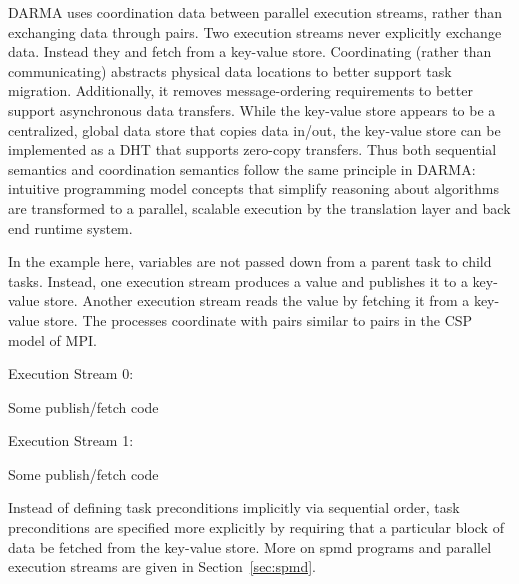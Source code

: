 \gls{DARMA} uses coordination data between parallel \glspl{execution stream},
rather than exchanging data through  pairs. 
Two \glspl{execution stream} never explicitly exchange data. Instead they
 and fetch from a \gls{key-value store}.
Coordinating (rather than communicating) abstracts physical data locations to
better support \gls{task} migration.
Additionally, it removes message-ordering requirements to better support
\gls{asynchronous} data transfers.
While the \gls{key-value store} appears to be a centralized, global data store that copies data in/out,
the \gls{key-value store} can be implemented as a \gls{DHT} that supports
\gls{zero-copy} transfers.
Thus both \gls{sequential semantics} and \gls{coordination semantics} follow
the same principle in \gls{DARMA}: intuitive \gls{programming model}
concepts that simplify reasoning about algorithms are 
transformed to a parallel, scalable execution by the \gls{translation layer}
and \gls{back end} \gls{runtime system}.

In the example here, variables are not passed down from a \gls{parent task} to
\glspl{child task}.
Instead, one \gls{execution stream} produces a value and publishes it to a
\gls{key-value store}.
Another \gls{execution stream} reads the value by fetching it from a
\gls{key-value store}.
The processes coordinate with  pairs similar to
 pairs in
the \gls{CSP} model of MPI.

\begin{minipage}{0.45\textwidth}
Execution Stream 0:
\begin{CppCode}
Some publish/fetch code
\end{CppCode}
\end{minipage}
\begin{minipage}{0.45\textwidth}
Execution Stream 1:
\begin{CppCode}
Some publish/fetch code
\end{CppCode}
\end{minipage}

Instead of defining \gls{task} \glspl{precondition} implicitly via sequential order,
\gls{task} \glspl{precondition} are specified more explicitly by requiring that
a particular block of data be fetched from the \gls{key-value store}.
More on \gls{spmd} programs and parallel \glspl{execution stream} are given in
Section~\ref{sec:spmd}.
